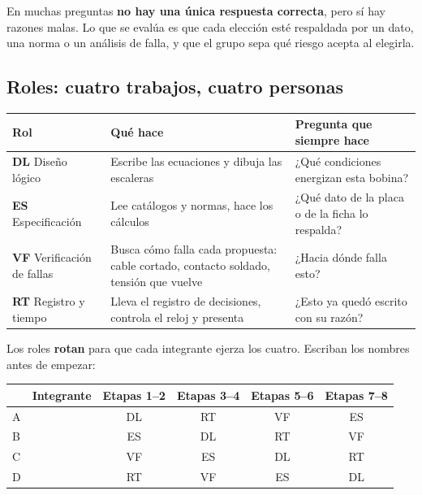 \documentclass[11pt,a4paper]{article}
\begin{document}
En muchas preguntas \textbf{no hay una única respuesta correcta}, pero sí hay razones malas. Lo que se evalúa es que cada elección esté respaldada por un dato, una norma o un análisis de falla, y que el grupo sepa qué riesgo acepta al elegirla.

\subsection*{Roles: cuatro trabajos, cuatro personas}

\begin{center}\small\renewcommand{\arraystretch}{1.25}
\begin{tabularx}{\linewidth}{@{}l L L@{}}
\toprule
\textbf{Rol} & \textbf{Qué hace} & \textbf{Pregunta que siempre hace}\\
\midrule
\textbf{DL} Diseño lógico & Escribe las ecuaciones y dibuja las escaleras & ¿Qué condiciones energizan esta bobina?\\
\textbf{ES} Especificación & Lee catálogos y normas, hace los cálculos & ¿Qué dato de la placa o de la ficha lo respalda?\\
\textbf{VF} Verificación de fallas & Busca cómo falla cada propuesta: cable cortado, contacto soldado, tensión que vuelve & ¿Hacia dónde falla esto?\\
\textbf{RT} Registro y tiempo & Lleva el registro de decisiones, controla el reloj y presenta & ¿Esto ya quedó escrito con su razón?\\
\bottomrule
\end{tabularx}
\end{center}

Los roles \textbf{rotan} para que cada integrante ejerza los cuatro. Escriban los nombres antes de empezar:

\begin{center}\small\renewcommand{\arraystretch}{1.35}
\begin{tabularx}{\linewidth}{@{}l L c c c c@{}}
\toprule
& \textbf{Integrante} & \textbf{Etapas 1--2} & \textbf{Etapas 3--4} & \textbf{Etapas 5--6} & \textbf{Etapas 7--8}\\
\midrule
A & & DL & RT & VF & ES\\
B & & ES & DL & RT & VF\\
C & & VF & ES & DL & RT\\
D & & RT & VF & ES & DL\\
\bottomrule
\end{tabularx}
\end{center}
\end{document}
